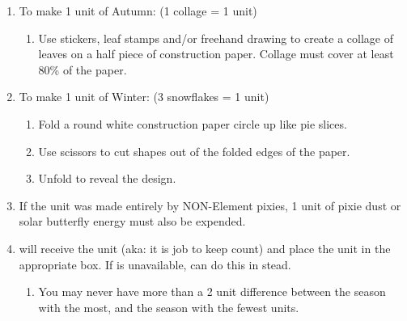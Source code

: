 \documentclass[green]{PP}
\begin{document}
\begin{enumerate}
\begin{enumerate}
	\end{enumerate}
	\item To make 1 unit of Autumn: (1 collage = 1 unit)
	\begin{enumerate}
		\item Use stickers, leaf stamps and/or freehand drawing to create a collage of leaves on a half piece of construction paper. Collage must cover at least 80\% of the paper.
	\end{enumerate}
	\item To make 1 unit of Winter: (3 snowflakes = 1 unit)
	\begin{enumerate}
		\item Fold a round white construction paper circle up like pie slices.
		\item Use scissors to cut shapes out of the folded edges of the paper.
		\item Unfold to reveal the design.
	\end{enumerate}
	\item If the unit was made entirely by NON-Element pixies, 1 unit of pixie dust or solar butterfly energy must also be expended.
	\item \cEHead{} will receive the unit (aka: it is \cEHead{\their} job to keep count) and place the unit in the appropriate box. If \cEHead{} is unavailable, \cSHead{} can do this in \cEHead{\their} stead.
	\begin{enumerate}
		\item You may never have more than a 2 unit difference between the season with the most, and the season with the fewest units.
	\end{enumerate}
\end{enumerate}
\end{document}
